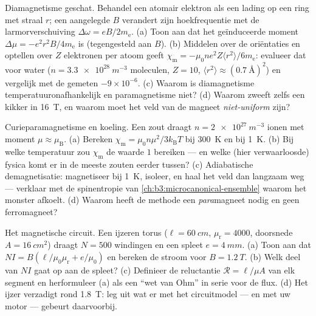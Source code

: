 \begin{exercise}[$\star\star$]\label{exo:b3:electromagnetism-in-matter:8}
Diamagnetisme geschat. Behandel een atomair elektron als een lading op een
ring met straal $r$; een aangelegde $B$ verandert zijn hoekfrequentie met
de larmorverschuiving $\Delta\omega = eB/2m_{\text{e}}$. (a) Toon aan dat het
geïnduceerde moment $\Delta\mu = -e^2r^2B/4m_{\text{e}}$ is (tegengesteld aan
$B$). (b) Middelen over de oriëntaties en optellen over $Z$ elektronen per
atoom geeft $\chi_{\text{m}} = -\mu_0ne^2Z\langle
r^2\rangle/6m_{\text{e}}$: evalueer dat voor water ($n =
\qty{3.3e28}{m^{-3}}$ moleculen, $Z = 10$, $\langle r^2\rangle
\approx (\qty{0.7}{\angstrom})^2$) en vergelijk met de gemeten
$-9\times10^{-6}$. (c) Waarom is diamagnetisme temperatuuronafhankelijk
en paramagnetisme niet? (d) Waarom zweeft zelfs een kikker in
\qty{16}{T}, en waarom moet het veld van de magneet \emph{niet-uniform} zijn?
\end{exercise}

\begin{exercise}[$\star\star$]\label{exo:b3:electromagnetism-in-matter:9}
Curieparamagnetisme en koeling. Een zout draagt $n =
\qty{2e27}{m^{-3}}$ ionen met moment $\mu \approx \mu_{\text{B}}$.
(a) Bereken $\chi_{\text{m}} = \mu_0n\mu^2/3k_{\text{B}}T$ bij
\qty{300}{K} en bij \qty{1}{K}. (b) Bij welke temperatuur zou
$\chi_{\text{m}}$ de waarde $1$ bereiken --- en welke (hier verwaarloosde)
fysica komt er in de meeste zouten eerder tussen? (c) Adiabatische demagnetisatie:
magnetiseer bij \qty{1}{K}, isoleer, en haal het veld dan langzaam weg ---
verklaar met de spinentropie van
\cref{ch:b3:microcanonical-ensemble} waarom het monster afkoelt. (d) Waarom
heeft de methode een \emph{para}magneet nodig en geen ferromagneet?
\end{exercise}

\begin{exercise}[$\star\star\star$]\label{exo:b3:electromagnetism-in-matter:10}
Het magnetische circuit. Een ijzeren torus ($\ell = \qty{60}{cm}$,
$\mu_{\text{r}} = 4000$, doorsnede $A = \qty{16}{cm^2}$) draagt
$N = 500$ windingen en een spleet $e = \qty{4}{mm}$. (a) Toon aan dat $NI =
B(\ell/\mu_0\mu_{\text{r}} + e/\mu_0)$ en bereken de stroom voor
$B = \qty{1.2}{T}$. (b) Welk deel van $NI$ gaat op aan de spleet?
(c) Definieer de reluctantie $\mathcal R = \ell/\mu A$ van elk
segment en herformuleer (a) als een ``wet van Ohm'' in serie voor de flux. (d)
Het ijzer verzadigt rond \qty{1.8}{T}: leg uit wat er met het
circuitmodel --- en met uw motor --- gebeurt daarvoorbij.
\end{exercise}

